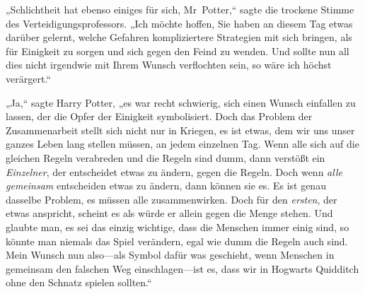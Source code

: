 „Schlichtheit hat ebenso einiges für sich, Mr~Potter,“ sagte die trockene Stimme des Verteidigungsprofessors. „Ich möchte hoffen, Sie haben an diesem Tag etwas darüber gelernt, welche Gefahren kompliziertere Strategien mit sich bringen, als für Einigkeit zu sorgen und sich gegen den Feind zu wenden. Und sollte nun all dies nicht irgendwie mit Ihrem Wunsch verflochten sein, so wäre ich höchst verärgert.“

„Ja,“ sagte Harry Potter, „es war recht schwierig, sich einen Wunsch einfallen zu lassen, der die Opfer der Einigkeit symbolisiert. Doch das Problem der Zusammenarbeit stellt sich nicht nur in Kriegen, es ist etwas, dem wir uns unser ganzes Leben lang stellen müssen, an jedem einzelnen Tag. Wenn alle sich auf die gleichen Regeln verabreden und die Regeln sind dumm, dann verstößt ein \emph{Einzelner}, der entscheidet etwas zu ändern, gegen die Regeln. Doch wenn \emph{alle gemeinsam} entscheiden etwas zu ändern, dann können sie es. Es ist genau dasselbe Problem, es müssen alle zusammenwirken. Doch für den \emph{ersten}, der etwas anspricht, scheint es als würde er allein gegen die Menge stehen. Und glaubte man, es sei das einzig wichtige, dass die Menschen immer einig sind, so könnte man niemals das Spiel verändern, egal wie dumm die Regeln auch sind. Mein Wunsch nun also—als Symbol dafür was geschieht, wenn Menschen in gemeinsam den falschen Weg einschlagen—ist es, dass wir in Hogwarts Quidditch ohne den Schnatz spielen sollten.“

